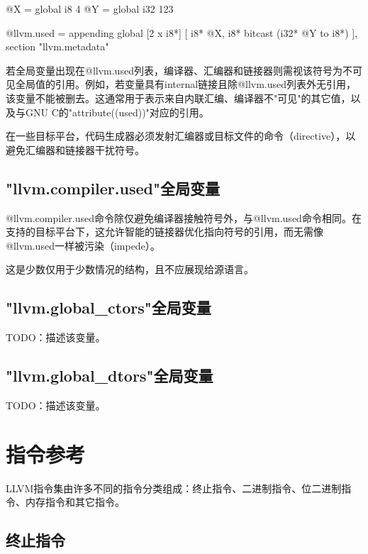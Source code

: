 \documentclass[12pt,a4paper]{article}
\begin{document}
{@X = global i8 4
@Y = global i32 123

@llvm.used = appending global [2 x i8*] [
   i8* @X,
   i8* bitcast (i32* @Y to i8*)
], section "llvm.metadata"

若全局变量出现在@llvm.used列表，编译器、汇编器和链接器则需视该符号为不可见全局值的引用。例如，若变量具有internal链接且除@llvm.used列表外无引用，该变量不能被删去。这通常用于表示来自内联汇编、编译器不"可见"的其它值，以及与GNU C的"attribute((used))"对应的引用。

在一些目标平台，代码生成器必须发射汇编器或目标文件的命令（directive），以避免汇编器和链接器干扰符号。

\subsection{"llvm.compiler.used"全局变量} %

@llvm.compiler.used命令除仅避免编译器接触符号外，与@llvm.used命令相同。在支持的目标平台下，这允许智能的链接器优化指向符号的引用，而无需像@llvm.used一样被污染（impede）。

这是少数仅用于少数情况的结构，且不应展现给源语言。

\subsection{"llvm.global\_ctors"全局变量} %

TODO：描述该变量。

\subsection{"llvm.global\_dtors"全局变量} %

TODO：描述该变量。

\section{指令参考} %

LLVM指令集由许多不同的指令分类组成：终止指令、二进制指令、位二进制指令、内存指令和其它指令。

\subsection{终止指令} %

}
\end{document}
